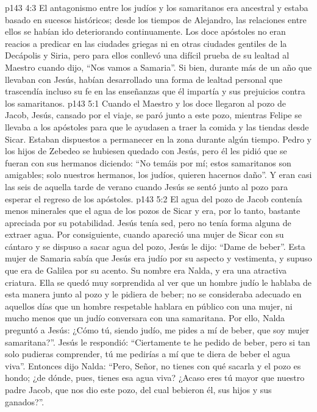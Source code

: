 \vs p143 4:3 El antagonismo entre los judíos y los samaritanos era ancestral y estaba basado en sucesos históricos; desde los tiempos de Alejandro, las relaciones entre ellos se habían ido deteriorando continuamente. Los doce apóstoles no eran reacios a predicar en las ciudades griegas ni en otras ciudades gentiles de la Decápolis y Siria, pero para ellos conllevó una difícil prueba de su lealtad al Maestro cuando dijo, “Nos vamos a Samaria”. Si bien, durante más de un año que llevaban con Jesús, habían desarrollado una forma de lealtad personal que trascendía incluso su fe en las enseñanzas que él impartía y sus prejuicios contra los samaritanos.
\vs p143 5:1 Cuando el Maestro y los doce llegaron al pozo de Jacob, Jesús, cansado por el viaje, se paró junto a este pozo, mientras Felipe se llevaba a los apóstoles para que le ayudasen a traer la comida y las tiendas desde Sicar. Estaban dispuestos a permanecer en la zona durante algún tiempo. Pedro y los hijos de Zebedeo se hubiesen quedado con Jesús, pero él les pidió que se fueran con sus hermanos diciendo: “No temáis por mí; estos samaritanos son amigables; solo nuestros hermanos, los judíos, quieren hacernos daño”. Y eran casi las seis de aquella tarde de verano cuando Jesús se sentó junto al pozo para esperar el regreso de los apóstoles.
\vs p143 5:2 El agua del pozo de Jacob contenía menos minerales que el agua de los pozos de Sicar y era, por lo tanto, bastante apreciada por su potabilidad. Jesús tenía sed, pero no tenía forma alguna de extraer agua. Por consiguiente, cuando apareció una mujer de Sicar con su cántaro y se dispuso a sacar agua del pozo, Jesús le dijo: “Dame de beber”. Esta mujer de Samaria sabía que Jesús era judío por su aspecto y vestimenta, y supuso que era de Galilea por su acento. Su nombre era Nalda, y era una atractiva criatura. Ella se quedó muy sorprendida al ver que un hombre judío le hablaba de esta manera junto al pozo y le pidiera de beber; no se consideraba adecuado en aquellos días que un hombre respetable hablara en público con una mujer, ni mucho menos que un judío conversara con una samaritana. Por ello, Nalda preguntó a Jesús: ¿Cómo tú, siendo judío, me pides a mí de beber, que soy mujer samaritana?”. Jesús le respondió: “Ciertamente te he pedido de beber, pero si tan solo pudieras comprender, tú me pedirías a mí que te diera de beber el agua viva”. Entonces dijo Nalda: “Pero, Señor, no tienes con qué sacarla y el pozo es hondo; ¿de dónde, pues, tienes esa agua viva? ¿Acaso eres tú mayor que nuestro padre Jacob, que nos dio este pozo, del cual bebieron él, sus hijos y sus ganados?”.
